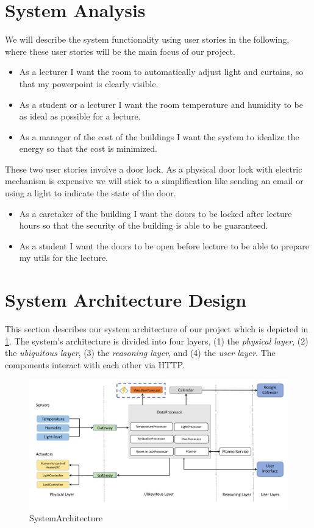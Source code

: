 \documentclass[runningheads]{llncs}
\begin{document}
\section{System Analysis}
We will describe the system functionality using user stories in the following, where these user stories will be the main focus of our project.
\begin{itemize}
\item As a lecturer I want the room to automatically adjust light and curtains, so that my powerpoint is clearly visible.
\item As a student or a lecturer I want the room temperature and humidity to be as ideal as possible for a lecture.
\item As a manager of the cost of the buildings I want the system to idealize the energy so that the cost is minimized.
\end{itemize}
 
These two user stories involve a door lock. As a physical door lock with electric mechanism is expensive we will stick to a simplification like sending an email or using a light to indicate the state of the door.
\begin{itemize}
\item As a caretaker of the building I want the doors to be locked after lecture hours so that the security of the building is able to be guaranteed. 
\item As a student I want the doors to be open before lecture to be able to prepare my utils for the lecture.\\
\end{itemize}

\section{System Architecture Design}
This section describes our system architecture of our project which is depicted in \cref{fig:SystemArchitecture}.
The system's architecture is divided into four layers, (1) the \textit{physical layer}, (2) the \textit{ubiquitous layer}, (3) the \textit{reasoning layer}, and (4) the \textit{user layer}.
The components interact with each other via HTTP.

\begin{figure}[H]
\centering
\includegraphics[width=1.0\textwidth]{../img/SystemArchitecture.pdf}
\caption{SystemArchitecture}
\label{fig:SystemArchitecture}
\end{figure}
\end{document}
